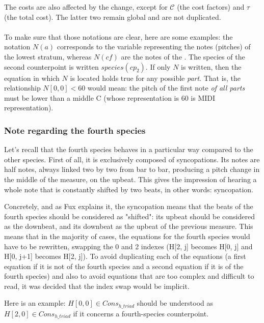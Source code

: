 The costs are also affected by the change, except for $\mathcal{C}$ (the cost factors) and $\tau$ (the total cost). The latter two remain global and are not duplicated.

\paragraph{}
To make sure that those notations are clear, here are some examples: the notation $N(a)$ corresponds to the variable representing the notes (pitches) of the lowest stratum, whereas $N(\mathit{cf})$ are the notes of the \cf. The species of the second counterpoint is written $species(cp_2)$. If only $N$ is written, then the equation in which $N$ is located holds true for any possible \textit{part}. That is, the relationship $N[0, 0] < 60$ would mean: the pitch of the first note \textit{of all parts} must be lower than a middle C (whose representation is 60 is MIDI representation).

\subsubsection{Note regarding the fourth species}\label{nota-bene-4th-species} Let's recall that the fourth species behaves in a particular way compared to the other species. First of all, it is exclusively composed of syncopations. Its notes are half notes, always linked two by two from bar to bar, producing a pitch change in the middle of the measure, on the upbeat. This gives the impression of hearing a whole note that is constantly shifted by two beats, in other words: syncopation.

Concretely, and as Fux explains it, the syncopation means that the beats of the fourth species should be considered as "shifted": its upbeat should be considered as the downbeat, and its downbeat as the upbeat of the previous measure. This means that in the majority of cases, the equations for the fourth species would have to be rewritten, swapping the 0 and 2 indexes (H[2, j] becomes H[0, j] and H[0, j+1] becomes H[2, j]). To avoid duplicating each of the equations (a first equation if it is not of the fourth species and a second equation if it is of the fourth species) and also to avoid equations that are too complex and difficult to read, it was decided that the index swap would be implicit.

Here is an example: $H[0, 0] \in Cons_{h\_triad}$ should be understood as $H[2, 0] \in Cons_{h\_triad}$ if it concerns a fourth-species counterpoint.


